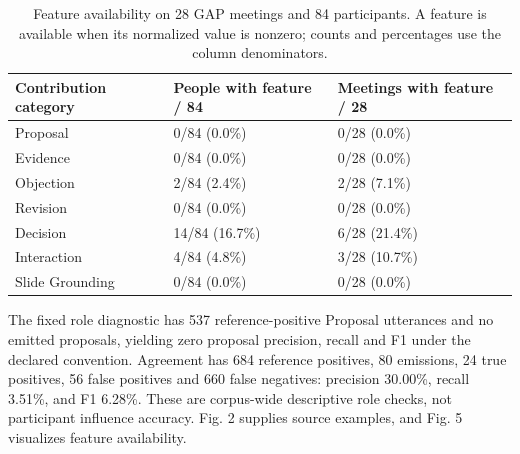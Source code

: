 \documentclass[journal]{IEEEtran}
\begin{document}
\begin{table}[t]
\caption{Feature availability on 28 GAP meetings and 84 participants. A feature is available when its normalized value is nonzero; counts and percentages use the column denominators.}
\label{tab:3}
\centering\footnotesize
\setlength{\tabcolsep}{3pt}
\renewcommand{\arraystretch}{1.13}
\begin{tabular}{p{}p{}p{}}
\toprule
{\raggedright Contribution category\par} & {\raggedright People with feature / 84\par} & {\raggedright Meetings with feature / 28\par} \\
\midrule
{\raggedright Proposal\par} & {\raggedright 0/84 (0.0\%)\par} & {\raggedright 0/28 (0.0\%)\par} \\
{\raggedright Evidence\par} & {\raggedright 0/84 (0.0\%)\par} & {\raggedright 0/28 (0.0\%)\par} \\
{\raggedright Objection\par} & {\raggedright 2/84 (2.4\%)\par} & {\raggedright 2/28 (7.1\%)\par} \\
{\raggedright Revision\par} & {\raggedright 0/84 (0.0\%)\par} & {\raggedright 0/28 (0.0\%)\par} \\
{\raggedright Decision\par} & {\raggedright 14/84 (16.7\%)\par} & {\raggedright 6/28 (21.4\%)\par} \\
{\raggedright Interaction\par} & {\raggedright 4/84 (4.8\%)\par} & {\raggedright 3/28 (10.7\%)\par} \\
{\raggedright Slide Grounding\par} & {\raggedright 0/84 (0.0\%)\par} & {\raggedright 0/28 (0.0\%)\par} \\
\bottomrule
\end{tabular}
\end{table}
The fixed role diagnostic has 537 reference-positive Proposal utterances and no emitted proposals, yielding zero proposal precision, recall and F1 under the declared convention. Agreement has 684 reference positives, 80 emissions, 24 true positives, 56 false positives and 660 false negatives: precision 30.00\%, recall 3.51\%, and F1 6.28\%. These are corpus-wide descriptive role checks, not participant influence accuracy. Fig. 2 supplies source examples, and Fig. 5 visualizes feature availability.
\end{document}
